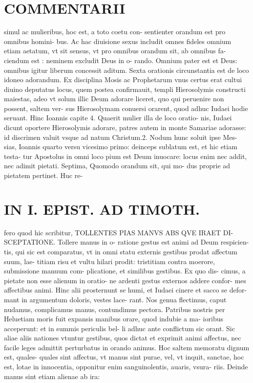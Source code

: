 \documentclass{article}
\begin{document}
\begin{pages}
\section*{COMMENTARII }\pstart simul ac mulieribus, hoc est, a toto coetu con- sentienter orandum est pro omnibus homini- bus. Ac hac diuisione sexus includit omnes fideles omnium etiam aetatum, vt sit sensus, vt pro omnibus orandum sit, ab omnibus fa- ciendum est : neminem excludit Deus in o- rando. Omnium pater est et Deus: omnibus igitur liberum concessit aditum.  \pend\pstart Sexta orationis circunstantia est de loco idoneo adorandum. Ex disciplina Mosis ac Prophetarum vnus certus erat cultui diuino deputatus locus, quem postea confirmauit, templi Hierosolymis constructi maiestas, adeo vt solum illic Deum adorare liceret, quo qui peruenire non possent, saltem ver- sus Hierosolymam conuersi orarent, quod adhuc Iudaei hodie seruant. Hinc Ioannis capite 4. Quaerit mulier illa de loco oratio- nis, Iudaei dicunt oportere Hierosolymis adorare, patres autem in monte Samariae adorasse: id discrimen valuit vsque ad natum Christum.2. Nodum hunc soluit ipse Mes- sias, Ioannis quarto versu vicesimo primo: deinceps sublatum est, et hic etiam testa- tur Apostolus in omni loco pium est Deum inuocare: locus enim nec addit, nec adimit pietati.  \pend\pstart Septima, Quomodo orandum sit, qui mo- dus proprie ad pietatem pertinet. Huc re-  \pend
\section*{IN I. EPIST. AD TIMOTH. }
\marginpar{[ p.53 ]}\pstart fero quod hic scribitur, TOLLENTES PIAS MANVS ABS QVE IRAET DI- SCEPTATIONE. Tollere manus in o- ratione gestus est animi ad Deum respicien- tis, qui sic est comparatus, vt in omni statu externis gestibus prodat affectum suum, lae- titiam risu et vultu hilari prodit: tristitiam contra moerore, submissione manuum com- plicatione, et similibus gestibus. Ex quo dis- cimus, a pietate non esse alienum in oratio- ne ardenti gestus externos addere confor- mes affectibus animi. Hinc alii prosternunt se humi, et Iudaei cinere et sacco se defor- mant in argumentum doloris, vestes lace- rant. Nos genua flectimus, caput nudamus, complicamus manus, contundimus pectora. Patribus nostris per Heluetiam moris fuit expansis manibus orare, quod indubie a ma- ioribus acceperunt: et in summis periculis bel- li adhuc ante conflictum sic orant.  \pend\pstart Sic aliae aliis nationes vtuntur gestibus, quos dictat et exprimit animi affectus, nec facile leges admittit perturbatus in orando animus.  \pend\pstart Hoc saltem memoratu dignum est, quales- quales sint affectus, vt manus sint purae, vel, vt inquit, sanctae, hoc est, lotae in innocentia, opponitur enim sanguinolentis, auaris, vsura- riis. Deinde manus sint etiam alienae ab ira:  \pend

\end{pages}
\end{document}

